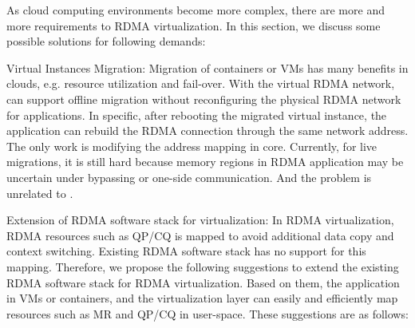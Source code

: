 As cloud computing environments become more complex, there are more and more  requirements to RDMA virtualization. In this section, we discuss some possible solutions for following demands:


Virtual Instances Migration:  Migration of containers or VMs has many benefits in clouds, e.g. resource utilization and fail-over. With the virtual RDMA network, \sys can support offline migration without reconfiguring the physical RDMA network for applications. In specific, after rebooting the migrated virtual instance, the application can rebuild the RDMA connection through the same network address. The only work is modifying the address mapping in \sys core. Currently, for live migrations, it is still hard because memory regions in RDMA application may be uncertain under bypassing or one-side communication. And the problem is unrelated to \sys.


Extension of RDMA software stack for virtualization: In RDMA virtualization, RDMA resources such as QP/CQ is mapped to avoid additional data copy and context switching. Existing RDMA software stack has no support for this mapping. Therefore, we propose the following suggestions to extend the existing RDMA software stack for RDMA virtualization. Based on them, the application in VMs or containers, and the virtualization layer can easily and efficiently map resources such as MR and QP/CQ in user-space. These suggestions are as follows:



